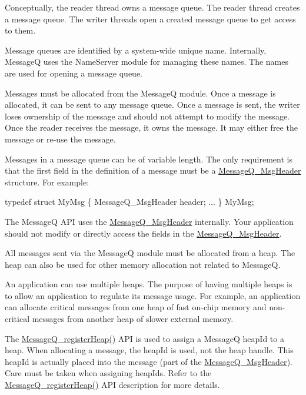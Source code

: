 Conceptually, the reader thread owns a message queue. The reader thread creates a message queue. The writer threads open a created message queue to get access to them.

Message queues are identified by a system-\/wide unique name. Internally, Message\-Q uses the Name\-Server module for managing these names. The names are used for opening a message queue.

Messages must be allocated from the Message\-Q module. Once a message is allocated, it can be sent to any message queue. Once a message is sent, the writer loses ownership of the message and should not attempt to modify the message. Once the reader receives the message, it owns the message. It may either free the message or re-\/use the message.

Messages in a message queue can be of variable length. The only requirement is that the first field in the definition of a message must be a \hyperlink{struct_message_q___msg_header}{Message\-Q\-\_\-\-Msg\-Header} structure. For example\-: 
\begin{DoxyCode}
    \textcolor{keyword}{typedef} \textcolor{keyword}{struct }MyMsg \{
        MessageQ_MsgHeader header;
        ...
    \} MyMsg;
\end{DoxyCode}


The Message\-Q A\-P\-I uses the \hyperlink{struct_message_q___msg_header}{Message\-Q\-\_\-\-Msg\-Header} internally. Your application should not modify or directly access the fields in the \hyperlink{struct_message_q___msg_header}{Message\-Q\-\_\-\-Msg\-Header}.

All messages sent via the Message\-Q module must be allocated from a heap. The heap can also be used for other memory allocation not related to Message\-Q.

An application can use multiple heaps. The purpose of having multiple heaps is to allow an application to regulate its message usage. For example, an application can allocate critical messages from one heap of fast on-\/chip memory and non-\/critical messages from another heap of slower external memory.

The \hyperlink{_message_q_8h_ab74ba85e9c7ebbb1a888df871fd2a6c6}{Message\-Q\-\_\-register\-Heap()} A\-P\-I is used to assign a Message\-Q heap\-Id to a heap. When allocating a message, the heap\-Id is used, not the heap handle. This heap\-Id is actually placed into the message (part of the \hyperlink{struct_message_q___msg_header}{Message\-Q\-\_\-\-Msg\-Header}). Care must be taken when assigning heap\-Ids. Refer to the \hyperlink{_message_q_8h_ab74ba85e9c7ebbb1a888df871fd2a6c6}{Message\-Q\-\_\-register\-Heap()} A\-P\-I description for more details.

